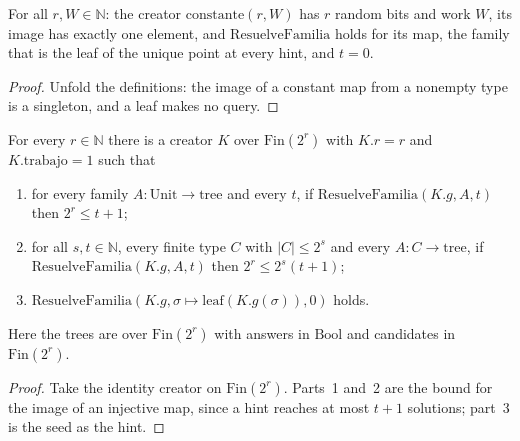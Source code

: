 \begin{theorem}
  \label{thm:information-not-work}
  \leanok
  For all $r, W \in \mathbb{N}$: the creator $\mathrm{constante}(r, W)$ has $r$ random bits and
  work $W$, its image has exactly one element, and $\mathrm{ResuelveFamilia}$ holds for its map, the
  family that is the leaf of the unique point at every hint, and $t = 0$.
  \own{}
\end{theorem}

\begin{proof}
  \leanok
  Unfold the definitions: the image of a constant map from a nonempty type is a singleton, and a
  leaf makes no query.
\end{proof}

\begin{theorem}
  \label{thm:information-asymmetry}
  \leanok
  For every $r \in \mathbb{N}$ there is a creator $K$ over $\mathrm{Fin}(2^r)$ with $K.r = r$ and
  $K.\mathrm{trabajo} = 1$ such that
  \begin{enumerate}
    \item for every family $A : \mathrm{Unit} \to \text{tree}$ and every $t$, if
      $\mathrm{ResuelveFamilia}(K.g, A, t)$ then $2^r \le t + 1$;
    \item for all $s, t \in \mathbb{N}$, every finite type $C$ with $|C| \le 2^s$ and every
      $A : C \to \text{tree}$, if $\mathrm{ResuelveFamilia}(K.g, A, t)$ then $2^r \le 2^s (t+1)$;
    \item $\mathrm{ResuelveFamilia}(K.g, \sigma \mapsto \mathrm{leaf}(K.g(\sigma)), 0)$ holds.
  \end{enumerate}
  Here the trees are over $\mathrm{Fin}(2^r)$ with answers in $\mathrm{Bool}$ and candidates in
  $\mathrm{Fin}(2^r)$.
  \own{}
\end{theorem}

\begin{proof}
  \leanok
  Take the identity creator on $\mathrm{Fin}(2^r)$. Parts~1 and~2 are the bound for the image of an
  injective map, since a hint reaches at most $t + 1$ solutions; part~3 is the seed as the hint.
\end{proof}


